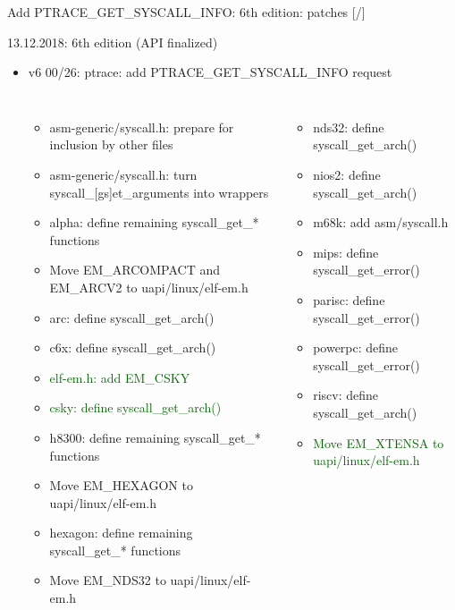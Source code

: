 \documentclass[unicode,aspectratio=169,xcolor={table,dvipsnames,usernames}]{beamer}
\begin{document}
\begin{frame}{Add PTRACE\_GET\_SYSCALL\_INFO: 6th edition: patches \hfill [\insertframenumber/\inserttotalframenumber]}
\Large
\begin{block}{13.12.2018: 6th edition (API finalized)}
\large
\begin{itemize}
	\setlength{\itemsep}{0pt}
	\item v6 00/26: ptrace: add PTRACE\_GET\_SYSCALL\_INFO request
	\begin{columns}
		\column{6cm}
			\begin{itemize}
				\tiny
				\setlength{\itemsep}{0pt}
				\item asm-generic/syscall.h: prepare for inclusion by other files
				\item asm-generic/syscall.h: turn syscall\_[gs]et\_arguments into wrappers
				\item alpha: define remaining syscall\_get\_* functions
				\item Move EM\_ARCOMPACT and EM\_ARCV2 to uapi/linux/elf-em.h
				\item arc: define syscall\_get\_arch()
				\item c6x: define syscall\_get\_arch()
				\item \textcolor{darkgreen}{elf-em.h: add EM\_CSKY}
				\item \textcolor{darkgreen}{csky: define syscall\_get\_arch()}
				\item h8300: define remaining syscall\_get\_* functions
				\item Move EM\_HEXAGON to uapi/linux/elf-em.h
				\item hexagon: define remaining syscall\_get\_* functions
				\item Move EM\_NDS32 to uapi/linux/elf-em.h
			\end{itemize}
		\column{7cm}
			\begin{itemize}
				\tiny
				\setlength{\itemsep}{0pt}
				\item nds32: define syscall\_get\_arch()
				\item nios2: define syscall\_get\_arch()
				\item m68k: add asm/syscall.h
				\item mips: define syscall\_get\_error()
				\item parisc: define syscall\_get\_error()
				\item powerpc: define syscall\_get\_error()
				\item riscv: define syscall\_get\_arch()
				\item \textcolor{darkgreen}{Move EM\_XTENSA to uapi/linux/elf-em.h}

\end{itemize}
\end{columns}
\end{itemize}
\end{block}
\end{frame}
\end{document}
